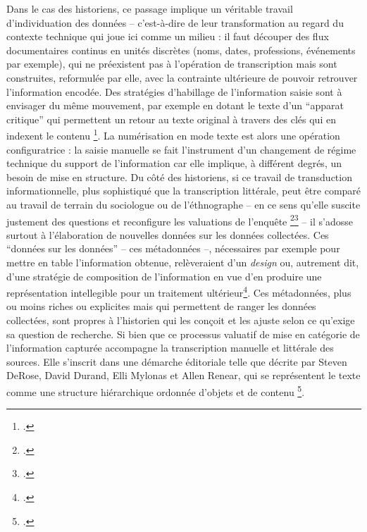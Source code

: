Dans le cas des historiens, ce passage implique un véritable travail d’individuation des données -- c'est-à-dire de leur transformation au regard du contexte technique qui joue ici comme un milieu : il faut découper des flux documentaires continus en unités discrètes (noms, dates, professions, événements par exemple), qui ne préexistent pas à l’opération de transcription mais sont construites, reformulée par elle, avec la contrainte ultérieure de pouvoir retrouver l'information encodée. Des stratégies d'habillage de l'information saisie sont à envisager du même mouvement, par exemple en dotant le texte d'un \enquote{apparat critique} qui permettent un retour au texte original à travers des clés qui en indexent le contenu \footcite[][]{vancampenhoudt}. La numérisation en mode texte est alors une opération configuratrice : la saisie manuelle se fait l’instrument d’un changement de régime technique du support de l'information car elle implique, à différent degrés, un besoin de mise en structure. Du côté des historiens, si ce travail de transduction informationnelle, plus sophistiqué que la transcription littérale, peut être comparé au travail de terrain du sociologue ou de l'éthnographe -- en ce sens qu'elle suscite justement des questions et reconfigure les valuations de l'enquête \footcite[][]{zalc}\footcite[][]{dewey} -- il s'adosse surtout à l'élaboration de nouvelles données sur les données collectées. Ces \enquote{données sur les données} -- ces métadonnées --, nécessaires par exemple pour mettre en table l'information obtenue, relèveraient d'un \emph{design} ou, autrement dit, d'une stratégie de composition de l'information en vue d'en produire une représentation intellegible pour un traitement ultérieur\footcite[][]{renon}. Ces métadonnées, plus ou moins riches ou explicites mais qui permettent de ranger les données collectées, sont propres à l'historien qui les conçoit et les ajuste selon ce qu'exige sa question de recherche. Si bien que ce processus valuatif de mise en catégorie de l'information capturée accompagne la transcription manuelle et littérale des sources. Elle s'inscrit dans une démarche éditoriale telle que décrite par Steven DeRose, David Durand, Elli Mylonas et Allen Renear, qui se représentent le texte comme une structure hiérarchique ordonnée d'objets et de contenu \footcite[][]{derose}. 


